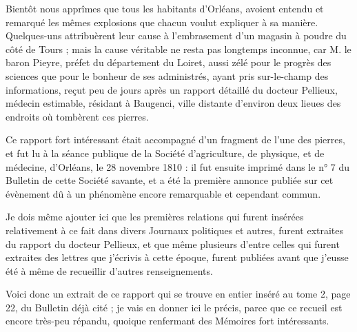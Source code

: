 \documentclass[a4paper, 12pt, oneside, french]{article}
\begin{document}
Bientôt nous apprîmes que tous les habitants d'Orléans, avoient entendu et remarqué les mêmes explosions que chacun voulut expliquer à sa manière. Quelques-uns attribuèrent leur cause à l'embrasement d'un magasin à poudre du côté de Tours ; mais la cause véritable ne resta pas longtemps inconnue, car M. le baron Pieyre, préfet du département du Loiret, aussi zélé pour le progrès des sciences que pour le bonheur de ses administrés, ayant pris sur-le-champ des informations, reçut peu de jours après un rapport détaillé du docteur Pellieux, médecin estimable, résidant à Baugenci, ville distante d'environ deux lieues des endroits où tombèrent ces pierres.

Ce rapport fort intéressant était accompagné d'un fragment de l'une des pierres, et fut lu à la séance publique de la Société d'agriculture, de physique, et de médecine, d'Orléans, le 28 novembre 1810 : il fut ensuite imprimé dans le n° 7 du Bulletin de cette Société savante, et a été la première annonce publiée sur cet évènement dû à un phénomène encore remarquable et cependant commun.

Je dois même ajouter ici que les premières relations qui furent insérées relativement à ce fait dans divers Journaux politiques et autres, furent extraites du rapport du docteur Pellieux, et que même plusieurs d'entre celles qui furent extraites des lettres que j'écrivis à cette époque, furent publiées avant que j'eusse été à même de recueillir d'autres renseignements.

Voici donc un extrait de ce rapport qui se trouve en entier inséré au tome 2, page 22, du Bulletin déjà cité ; je vais en donner ici le précis, parce que ce recueil est encore très-peu répandu, quoique renfermant des Mémoires fort intéressants.
\end{document}
